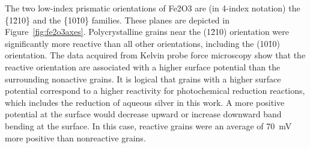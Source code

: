 \documentclass[12pt,%
              twoside,
               letterpaper]{uiothesis}
\begin{document}
The two low-index prismatic orientations  of Fe2O3 are (in 4-index notation) the
\{1\={2}10\} and the \{10\={1}0\} families. These planes are depicted in
Figure~\ref{fig:fe2o3axes}. Polycrystalline grains near the (1\={2}10) orientation were
significantly more reactive than all other orientations, including the (10\={1}0)
orientation. The data acquired from Kelvin probe force microscopy show that the reactive
orientation are associated with a higher surface potential than the surrounding nonactive
grains. It is logical that grains with a higher surface potential correspond to a higher
reactivity for photochemical reduction reactions, which includes the reduction of aqueous
silver in this work. A more positive potential at the surface would decrease upward or
increase downward band bending at the surface. In this case, reactive grains were an
average of \SI{70}{\milli\volt} more positive than nonreactive grains. 
\end{document}
